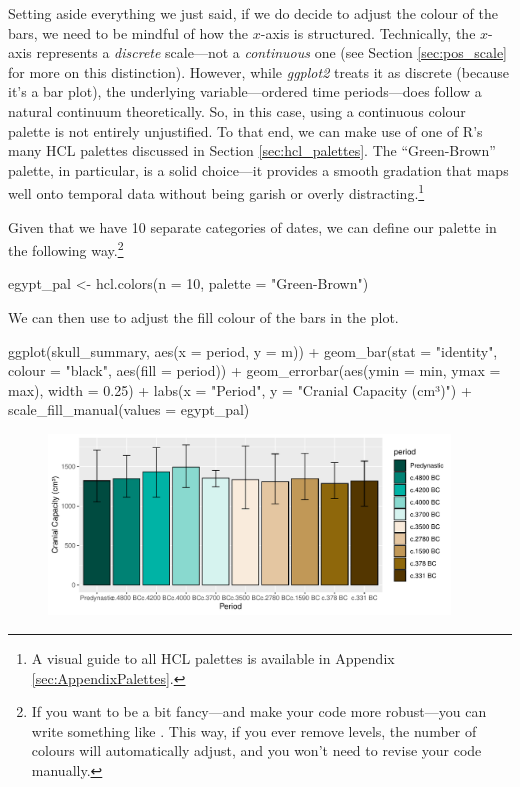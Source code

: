 Setting aside everything we just said, if we do decide to adjust the colour of the bars, we need to be mindful of how the $x$-axis is structured. Technically, the $x$-axis represents a \textit{discrete} scale—not a \textit{continuous} one (see Section \ref{sec:pos_scale} for more on this distinction). However, while \textit{ggplot2} treats it as discrete (because it's a bar plot), the underlying variable—ordered time periods—does follow a natural continuum theoretically. So, in this case, using a continuous colour palette is not entirely unjustified. To that end, we can make use of one of R’s many HCL palettes discussed in Section \ref{sec:hcl_palettes}. The ``Green-Brown'' palette, in particular, is a solid choice—it provides a smooth gradation that maps well onto temporal data without being garish or overly distracting.\footnote{A visual guide to all HCL palettes is available in Appendix \ref{sec:AppendixPalettes}.}

Given that we have 10 separate categories of dates, we can define our palette in the following way.\footnote{If you want to be a bit fancy—and make your code more robust—you can write something like . This way, if you ever remove levels, the number of colours will automatically adjust, and you won’t need to revise your code manually.}

\begin{inR}
egypt_pal <- hcl.colors(n = 10, palette = "Green-Brown")
\end{inR}

\clearpage

\noindent
We can then use  to adjust the fill colour of the bars in the plot.

\begin{inRhigh}[highlightlines={2,5}]
ggplot(skull_summary, aes(x = period, y = m)) +
  geom_bar(stat = "identity", colour = "black", aes(fill = period)) +
  geom_errorbar(aes(ymin = min, ymax = max), width = 0.25) +
  labs(x = "Period", y = "Cranial Capacity (cm³)") +
  scale_fill_manual(values = egypt_pal)
\end{inRhigh}

\vspace{2em}

\begin{figure}[H]
\includegraphics[width = 0.95\textwidth]{graphics/ch3Figs/bar_6.pdf}
\end{figure}

